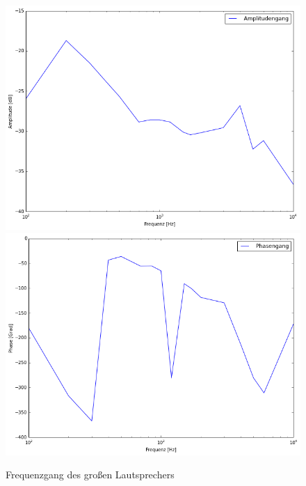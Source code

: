 \documentclass[12pt,oneside,a4paper]{report}
\begin{document}
\begin{figure}
\centering\small
\includegraphics[scale=0.6]{src/AmplitudenspektrumLautsprecher1.png}
\includegraphics[scale=0.6]{src/PhasenverschiebungLautsprecher1.png}
\caption{Frequenzgang des großen Lautsprechers}
\label{fig:LAUT_TIEF_FREQUENZGANG}
\end{figure}
\end{document}
